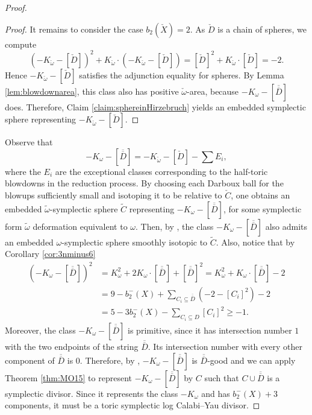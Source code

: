 \documentclass[11pt]{article}
\theoremstyle{definition}
\theoremstyle{remark}
\begin{document}
\begin{proof}
\begin{proof}
     It remains to consider the case $b_2(\check{X})=2$.  As $\check{D}$ is a chain of spheres, we compute
     \[
     (-K_{\check{\omega}}-[\check{D}])^2+K_{\check{\omega}}\cdot(-K_{\check{\omega}}-[\check{D}])
     =[\check{D}]^2+K_{\check{\omega}}\cdot[\check{D}]=-2.
     \]
     Hence $-K_{\check{\omega}}-[\check{D}]$ satisfies the adjunction equality for spheres. By Lemma \ref{lem:blowdownarea}, this class also has positive $\check{\omega}$-area, because $-K_\omega-[\overline{\overline{D}}]$ does. Therefore, Claim \ref{claim:sphereinHirzebruch} yields an embedded symplectic sphere representing $-K_{\check{\omega}}-[\check{D}]$.
  \end{proof}
Observe that
\[
  -K_\omega-[\overline{\overline{D}}]
  =-K_{\check{\omega}}-[\check{D}]-\sum E_i,
\]
where the $E_i$ are the exceptional classes corresponding to the half-toric blowdowns in the reduction process. By choosing each Darboux ball for the blowups sufficiently small and isotoping it to be relative to $\check{C}$, one obtains an embedded $\tilde{\omega}$-symplectic sphere $\tilde{C}$ representing $-K_\omega-[\overline{\overline{D}}]$, for some symplectic form $\tilde{\omega}$ deformation equivalent to $\omega$. Then, by \cite[Theorem 1.3]{DLW}, the class $-K_\omega-[\overline{\overline{D}}]$ also admits an embedded $\omega$-symplectic sphere smoothly isotopic to $\tilde{C}$. Also, notice that by Corollary \ref{cor:3nminus6}
\begin{align*}
(-K_\omega-[\overline{\overline{D}}])^2&=K_{\omega}^2+2K_\omega\cdot [\overline{\overline{D}}]+[\overline{\overline{D}}]^2=K_{\omega}^2+K_\omega\cdot [\overline{\overline{D}}]-2\\
&=9-b_2^-(X)+\sum_{C_i\subseteq \overline{\overline{D}}} (-2-[C_i]^2)-2\\
&=5-3b_2^-(X)-\sum_{C_i\subseteq D} [C_i]^2\geq -1.
\end{align*}
Moreover, the class $-K_\omega-[\overline{\overline{D}}]$ is primitive, since it has intersection number $1$ with the two endpoints of the string $\overline{\overline{D}}$. Its intersection number with every other component of $\overline{\overline{D}}$ is $0$.
Therefore, by \cite[Lemma 2.13]{LN25}, $-K_\omega-[\overline{\overline{D}}]$ is $\overline{\overline{D}}$-good and we can apply Theorem \ref{thm:MO15} to represent $-K_\omega-[\overline{\overline{D}}]$ by $C$ such that $C\cup \overline{\overline{D}}$ is a symplectic divisor. Since it represents the class $-K_\omega$ and has $b_2^-(X)+3$ components, it must be a toric symplectic log Calabi--Yau divisor.
\end{proof}
\end{document}
